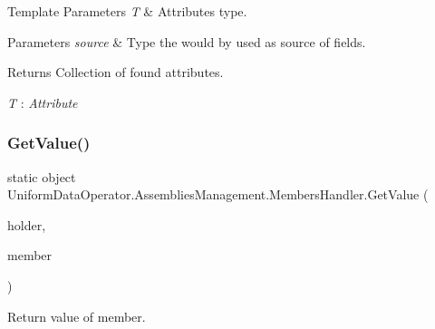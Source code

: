\begin{DoxyTemplParams}{Template Parameters}
{\em T} & Attribute\textquotesingle{}s type.\\
\hline
\end{DoxyTemplParams}

\begin{DoxyParams}{Parameters}
{\em source} & Type the would by used as source of fields.\\
\hline
\end{DoxyParams}
\begin{DoxyReturn}{Returns}
Collection of found attributes.
\end{DoxyReturn}
\begin{Desc}
\item[Type Constraints]\begin{description}
\item[{\em T} : {\em Attribute}]\end{description}
\end{Desc}
\mbox{\label{class_uniform_data_operator_1_1_assemblies_management_1_1_members_handler_a6cc89d5d7bbec4fe48b7f698ead2667f}} 
\subsubsection{\texorpdfstring{Get\+Value()}{GetValue()}}
{\footnotesize\ttfamily static object Uniform\+Data\+Operator.\+Assemblies\+Management.\+Members\+Handler.\+Get\+Value (\begin{DoxyParamCaption}\item[{object}]{holder,  }\item[{Member\+Info}]{member }\end{DoxyParamCaption})\hspace{0.3cm}{\ttfamily [static]}}



Return value of member. 


